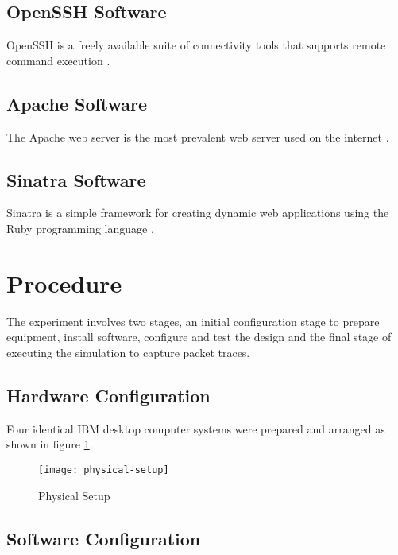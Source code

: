 \subsection{OpenSSH Software}

OpenSSH is a freely available suite of connectivity tools
\parencite{:2010zr,:ve} that supports remote command execution
\parencite{Tucker:2010ly}.

\cite{:2010zr}

\subsection{Apache Software}

The Apache web server is the most prevalent web server used on the internet
\parencite{2010:dq}.  \cite{:qf}

\subsection{Sinatra Software}

Sinatra is a simple framework for creating dynamic web applications using the
Ruby programming language \parencite{:2010bh}.

\section{Procedure}

The experiment involves two stages, an initial configuration stage to prepare
equipment, install software, configure and test the design and the final stage
of executing the simulation to capture packet traces.

\subsection{Hardware Configuration}

Four identical IBM desktop computer systems were prepared and arranged as shown
in figure \ref{physical-setup}.

\begin{figure}[H]
  \centering\texttt{[image: physical-setup]}
  \caption{Physical Setup}
  \label{physical-setup}
\end{figure}

\subsection{Software Configuration}

